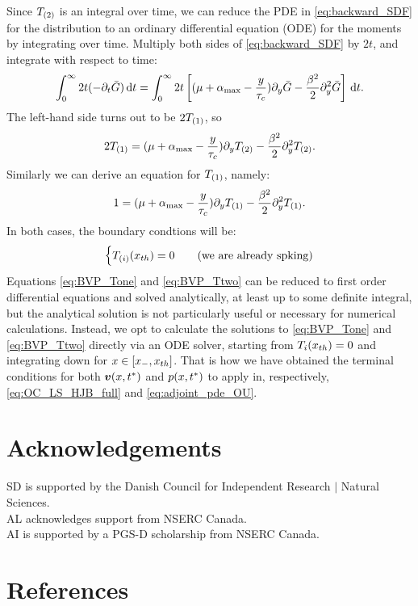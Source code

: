 \documentclass[12pt]{iopart}
\begin{document}
Since ${ {T}_{(2)} }$ is an integral over time, we can reduce the PDE in
\cref{eq:backward_SDF} for the distribution to an ordinary differential equation
(ODE) for the moments by integrating over time. Multiply both sides of
\cref{eq:backward_SDF} by $2t$, and integrate with respect to time:
\begin{equation}
\int_0^\infty 2t (-{\partial}_t { \bar{G} }) \, \mathrm{d} t
=
\int_0^\infty  2t \left[ ({\mu } + { {\alpha}_{\textrm{max}} } - \frac y{{ \tau_{c} }}) {\partial}_y{ \bar{G} } - \frac {{\beta}^2} 2
{\partial}_y^2 { \bar{G} }\right]
\, \mathrm{d} t.
\end{equation}
The left-hand side turns out to be $2{ {T}_{(1)} }$, so
\begin{equation}  
2{ {T}_{(1)} }
=({\mu } + { {\alpha}_{\textrm{max}} } - \frac y{{ \tau_{c} }})   {\partial}_y { {T}_{(2)} }
- \frac {{\beta}^2} 2
{\partial}_y^2 { {T}_{(2)} }.
\label{eq:BVP_Ttwo}
\end{equation}
Similarly we can derive an equation for ${ {T}_{(1)} }$, namely:
\begin{equation}
1
=({\mu } + { {\alpha}_{\textrm{max}} } - \frac y{{ \tau_{c} }})   {\partial}_y { {T}_{(1)} }
- \frac {{\beta}^2} 2
{\partial}_y^2 { {T}_{(1)} }.
\label{eq:BVP_Tone}
\end{equation}
In both cases, the boundary condtions will be:
\begin{equation}
\begin{cases}
{ {T}_{(i)} }({ x_{th} }) = 0 & \quad (\textrm{we are already spking})
\end{cases}
\label{eq:BVP_Ti_BCs}
\end{equation}
Equations \ref{eq:BVP_Tone} and \ref{eq:BVP_Ttwo} can be reduced to first order
differential equations and solved analytically, at least up to some definite integral,
but the analytical solution is not particularly useful or necessary for
numerical calculations. Instead, we opt to calculate the solutions to
\ref{eq:BVP_Tone} and \ref{eq:BVP_Ttwo} directly via an ODE solver, starting
from $T_i({ x_{th} }) = 0$ and integrating down for $x  \in [{ x_{-} }, { x_{th} }]$.
That is how we have obtained the terminal conditions for both ${ \boldsymbol{v} }(x,{ t^* })$ and
$p(x,{ t^* })$ to apply in, respectively, \cref{eq:OC_LS_HJB_full} and
\cref{eq:adjoint_pde_OU}.




\section*{Acknowledgements}
SD is supported by the Danish Council for Independent Research $\mid$ 
Natural Sciences.
\\ 
AL acknowledges support from NSERC Canada.  
\\
AI is supported by a PGS-D scholarship from NSERC Canada.

\section*{References}
  
 
\end{document}
